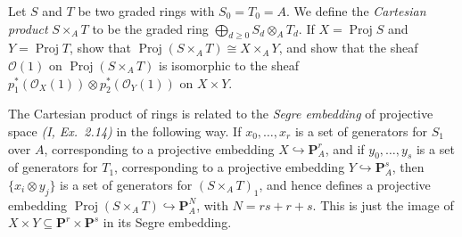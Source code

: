 \documentclass[10pt]{article}
\theoremstyle{definition}
\theoremstyle{remark}
\numberwithin{equation}{section}
\numberwithin{figure}{subsubsection}
\DeclareMathOperator{\Proj}{Proj}
\newcommand{\OO}{\mathcal{O}}
\begin{document}
\begin{problem}
  Let $S$ and $T$ be two graded rings with $S_0 = T_0 = A$. We define the \emph{Cartesian product} $S \times_A T$ to be the graded ring $\bigoplus_{d \ge 0} S_d \otimes_A T_d$. If $X = \Proj S$ and $Y = \Proj T$, show that $\Proj(S \times_A T) \cong X \times_A Y$, and show that the sheaf $\OO(1)$ on $\Proj(S \times_A T)$ is isomorphic to the sheaf $p_1^*(\OO_X(1)) \otimes p_2^*(\OO_Y(1))$ on $X \times Y$.
  \par The Cartesian product of rings is related to the \emph{Segre embedding} of projective space \emph{(I, Ex.~2.14)} in the following way. If $x_0,\ldots,x_r$ is a set of generators for $S_1$ over $A$, corresponding to a projective embedding $X \hookrightarrow \mathbf{P}^r_A$, and if $y_0,\ldots,y_s$ is a set of generators for $T_1$, corresponding to a projective embedding $Y \hookrightarrow \mathbf{P}_A^s$, then $\{x_i \otimes y_j\}$ is a set of generators for $(S \times_A T)_1$, and hence defines a projective embedding $\Proj(S \times_A T) \hookrightarrow \mathbf{P}^N_A$, with $N = rs + r + s$. This is just the image of $X \times Y \subseteq \mathbf{P}^r \times \mathbf{P}^s$ in its Segre embedding.
\end{problem}
\end{document}
